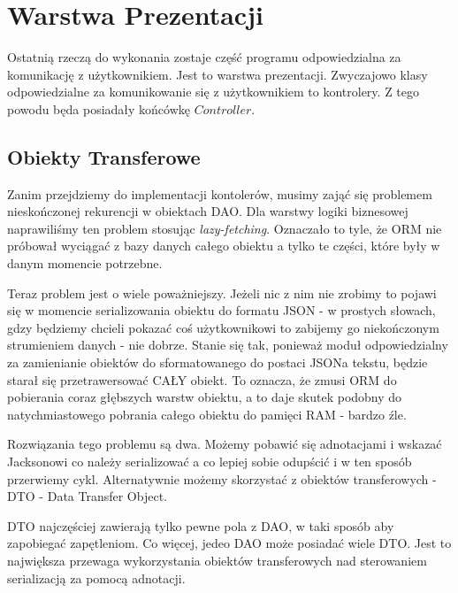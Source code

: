\documentclass{article}
\begin{document}
    \section{Warstwa Prezentacji}
        Ostatnią rzeczą do wykonania zostaje część programu odpowiedzialna za komunikację z użytkownikiem. Jest to warstwa prezentacji. Zwyczajowo klasy odpowiedzialne za komunikowanie się z użytkownikiem to kontrolery. Z tego powodu będa posiadały końcówkę $Controller$.
        \subsection{Obiekty Transferowe}
            Zanim przejdziemy do implementacji kontolerów, musimy zająć się problemem nieskończonej rekurencji w obiektach DAO. Dla warstwy logiki biznesowej naprawiliśmy ten problem stosując \emph{lazy-fetching}. Oznaczało to tyle, że ORM nie próbował wyciągać z bazy danych całego obiektu a tylko te części, które były w danym momencie potrzebne. 
            
            Teraz problem jest o wiele poważniejszy. Jeżeli nic z nim nie zrobimy to pojawi się w momencie serializowania obiektu do formatu JSON - w prostych słowach, gdzy będziemy chcieli pokazać coś użytkownikowi to zabijemy go niekończonym strumieniem danych - nie dobrze. Stanie się tak, ponieważ moduł odpowiedzialny za zamienianie obiektów do sformatowanego do postaci JSONa tekstu, będzie starał się przetrawersować CAŁY obiekt. To oznacza, że zmusi ORM do pobierania coraz głębszych warstw obiektu, a to daje skutek podobny do natychmiastowego pobrania całego obiektu do pamięci RAM - bardzo źle. 
            
            Rozwiązania tego problemu są dwa. Możemy pobawić się adnotacjami i wskazać Jacksonowi co należy serializować a co lepiej sobie odupścić i w ten sposób przerwiemy cykl. Alternatywnie możemy skorzystać z obiektów transferowych - DTO - Data Transfer Object. 
            
            DTO najczęściej zawierają tylko pewne pola z DAO, w taki sposób aby zapobiegać zapętleniom. Co więcej, jedeo DAO może posiadać wiele DTO. Jest to największa przewaga wykorzystania obiektów transferowych nad sterowaniem serializacją za pomocą adnotacji.
            
\end{document}
